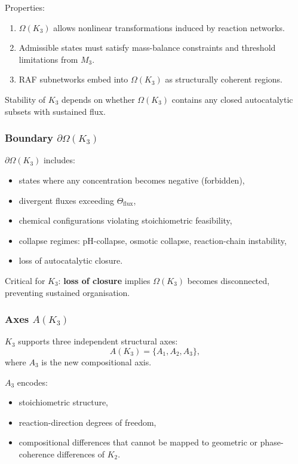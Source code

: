 Properties:
\begin{enumerate}
    \item $\Omega(K_3)$ allows nonlinear transformations induced by
          reaction networks.
    \item Admissible states must satisfy mass-balance constraints and
          threshold limitations from $M_3$.
    \item RAF subnetworks embed into $\Omega(K_3)$ as structurally
          coherent regions.
\end{enumerate}

Stability of $K_3$ depends on whether $\Omega(K_3)$ contains any closed
autocatalytic subsets with sustained flux.

\subsubsection{Boundary \texorpdfstring{$\partial\Omega(K_3)$}{\partial\Omega(K_3)}}

$\partial\Omega(K_3)$ includes:
\begin{itemize}
    \item states where any concentration becomes negative (forbidden),
    \item divergent fluxes exceeding $\Theta_{\mathrm{flux}}$,
    \item chemical configurations violating stoichiometric feasibility,
    \item collapse regimes: pH-collapse, osmotic collapse,
          reaction-chain instability,
    \item loss of autocatalytic closure.
\end{itemize}

Critical for $K_3$:  
\textbf{loss of closure} implies $\Omega(K_3)$ becomes disconnected,
preventing sustained organisation.

\subsubsection{Axes \texorpdfstring{$A(K_3)$}{A(K_3)}}

$K_3$ supports three independent structural axes:
\[
A(K_3) = \{A_1, A_2, A_3\},
\]
where $A_3$ is the new compositional axis.

$A_3$ encodes:
\begin{itemize}
    \item stoichiometric structure,
    \item reaction-direction degrees of freedom,
    \item compositional differences that cannot be mapped to geometric
          or phase-coherence differences of $K_2$.
\end{itemize}

